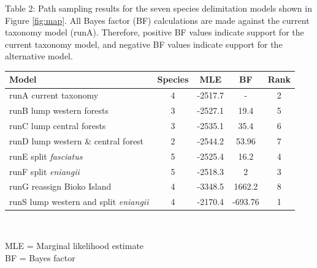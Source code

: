 {Table 2: Path sampling results for the seven species delimitation models shown in Figure \ref{fig:map}. All Bayes factor (BF) calculations are made against the current taxonomy model (runA). Therefore, positive BF values indicate support for the current taxonomy model, and negative BF values indicate support for the alternative model.
\begin{table}[ht]
\tabcolsep=0.2cm
\begin{center}
\begin{tabular}{l c c c c } 
\hline     
Model 	&	 Species 	&	 MLE 	&	 BF 	&	 Rank\\\hline
runA     current taxonomy   	&	4	&	-2517.7	&	   -   	&	   2\\
runB     lump western forests   	&	3	&	-2527.1	&	19.4	&	   5\\
runC     lump central forests   	&	3	&	-2535.1	&	35.4	&	   6\\
runD     lump western \&  central forest	&	2	&	-2544.2	&	53.96	&	   7\\
runE     split \textit{fasciatus}   	&	5	&	-2525.4	&	16.2	&	   4\\
runF     split \textit{eniangii}    	&	5	&	-2518.3	&	2	&	   3\\
runG     reassign Bioko Island  	&	4	&	-3348.5	&	1662.2	&	   8\\
runS    lump western and split \textit{eniangii}    	&	4	&	-2170.4	&	-693.76	&	   1\\
\end{tabular}\\
\end{center}
MLE = Marginal likelihood estimate\\
BF = Bayes factor\\
\end{table}
}


